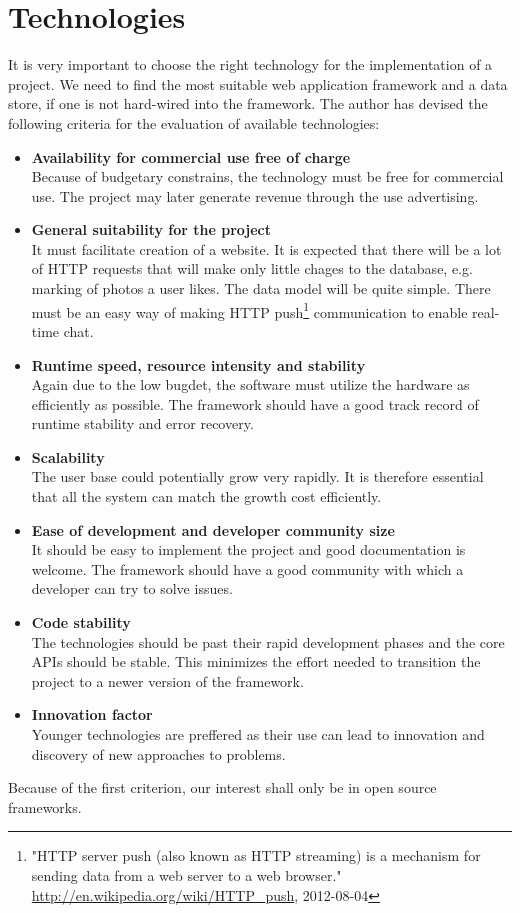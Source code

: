 \documentclass[12pt,oneside]{fithesis}
\begin{document}
\section{Technologies}
	It is very important to choose the right technology for the implementation of a project. We need to find the most suitable web application framework and a data store, if one is not hard-wired into the framework. The author has devised the following criteria for the evaluation of available technologies:
	\begin{itemize}
		\item \textbf{Availability for commercial use free of charge}\\
			Because of budgetary constrains, the technology must be free for commercial use. The project may later generate revenue through the use advertising.
		\item \textbf{General suitability for the project}\\
			It must facilitate creation of a website. It is expected that there will be a lot of HTTP requests that will make only little chages to the database, e.g. marking of photos a user likes. The data model will be quite simple. There must be an easy way of making HTTP push\footnote{"HTTP server push (also known as HTTP streaming) is a mechanism for sending data from a web server to a web browser." \url{http://en.wikipedia.org/wiki/HTTP_push}, {2012-08-04}} communication to enable real-time chat. 
		\item \textbf{Runtime speed, resource intensity and stability}\\
			Again due to the low bugdet, the software must utilize the hardware as efficiently as possible. The framework should have a good track record of runtime stability and error recovery.
		\item \textbf{Scalability}\\
			The user base could potentially grow very rapidly. It is therefore essential that all the system can match the growth cost efficiently.
		\item \textbf{Ease of development and developer community size}\\
			It should be easy to implement the project and good documentation is welcome. The framework should have a good community with which a developer can try to solve issues.
		\item \textbf{Code stability}\\
			The technologies should be past their rapid development phases and the core APIs should be stable. This minimizes the effort needed to transition the project to a newer version of the framework. 
		\item \textbf{Innovation factor}\\
			Younger technologies are preffered as their use can lead to innovation and discovery of new approaches to problems.
	\end{itemize}
	Because of the first criterion, our interest shall only be in open source frameworks.
\end{document}
